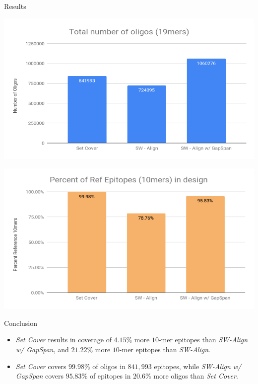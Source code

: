 \documentclass[final]{beamer}
\newlength{\colwidth}
\begin{document}
\begin{frame}[t]
\begin{columns}[t]
\begin{column}{\colwidth}
  \begin{block}{Results}
    \begin{minipage}[t]{0.5\colwidth}
        \includegraphics[width=0.5\colwidth,height=15\baselineskip]{figures/total_num_oligos.png}
    \end{minipage}%
    \begin{minipage}[t]{0.5\colwidth}
      \includegraphics[width=0.5\colwidth,height=15\baselineskip]{figures/percent_ref_epis.png}
    \end{minipage}
  \end{block}

  \begin{block}{Conclusion}
    \begin{itemize}
    \item \emph{Set Cover} results in coverage of $4.15\%$ more $10$-mer epitopes than \emph{SW-Align w/ GapSpan}, and
           $21.22\%$ more $10$-mer epitopes than \emph{SW-Align}.
         \item \emph{Set Cover} covers $99.98\%$ of oligos in $841,993$ epitopes, while \emph{SW-Align w/ GapSpan} covers $95.83\%$ of epitopes in
           $20.6\%$ more oligos than \emph{Set Cover}.
    \end{itemize}


\end{block}
\end{column}
\end{columns}
\end{frame}
\end{document}

